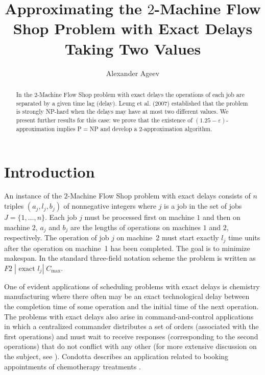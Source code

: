 \documentclass[12pt,a4paper]{article}
\author{Alexander Ageev}
\title{Approximating the $2$-Machine Flow Shop Problem with Exact Delays Taking Two Values}
\begin{document}
\date{}
\maketitle


\begin{abstract} In the $2$-Machine Flow Shop problem
with exact delays the operations of each job are separated by a
given time lag (delay). Leung et al. (2007) established that the
problem is strongly NP-hard when the delays may have at most two
different values. We present further results for this case: we prove
that the existence of $(1.25-\varepsilon)$-approximation implies
P$=$NP and develop a $2$-approximation algorithm.
\end{abstract}

\section{Introduction}
\label{intro} An instance of the $2$-Machine Flow Shop problem with
exact delays consists of $n$ triples $(a_j, l_j, b_j)$ of
nonnegative integers where $j$ is a job in the set of jobs
$J=\{1,\dots , n\}$. Each job $j$ must be processed first on machine
$1$ and then on machine $2$, $a_j$ and $b_j$ are the lengths of
operations on machines $1$ and $2$, respectively. The operation of
job $j$ on machine~2 must start exactly $l_j$ time units after the
operation on machine~1 has been completed. The goal is to minimize
makespan. In the standard three-field notation scheme the problem is
written as $F2\;|\mbox{ exact }l_j|\;C_{\max}$.

One  of evident applications of scheduling problems with exact
delays is chemistry manufacturing where there often may be an exact
technological delay between the completion time of some operation
and the initial time of the next operation. The problems with exact
delays also arise in com\-mand-and-control applications in which a
centralized commander distributes a set of orders (associated with
the first operations) and must wait to receive responses
(corresponding to the second operations) that do not conflict with
any other (for more extensive discussion on the subject, see
\cite{ESS,SS}). Condotta \cite{Con} describes an application related
to booking appointments of chemotherapy treatments \cite{Con}.
\end{document}
